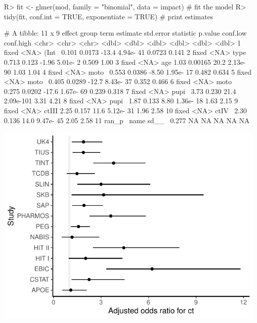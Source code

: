 \documentclass[
]{jss}
\begin{document}
\begin{CodeChunk}
\begin{CodeInput}
R> fit <- glmer(mod, family = "binomial", data = impact) # fit the model
R> tidy(fit, conf.int = TRUE, exponentiate = TRUE)       # print estimates
\end{CodeInput}
\begin{CodeOutput}
# A tibble: 11 x 9
   effect group term  estimate std.error statistic    p.value conf.low conf.high
   <chr>  <chr> <chr>    <dbl>     <dbl>     <dbl>      <dbl>    <dbl>     <dbl>
 1 fixed  <NA>  (Int~    0.101   0.0173     -13.4   4.94e- 41   0.0723     0.141
 2 fixed  <NA>  type~    0.713   0.123       -1.96  5.01e-  2   0.509      1.00 
 3 fixed  <NA>  age      1.03    0.00165     20.2   2.13e- 90   1.03       1.04 
 4 fixed  <NA>  moto~    0.553   0.0386      -8.50  1.95e- 17   0.482      0.634
 5 fixed  <NA>  moto~    0.405   0.0289     -12.7   8.43e- 37   0.352      0.466
 6 fixed  <NA>  moto~    0.275   0.0202     -17.6   1.67e- 69   0.239      0.318
 7 fixed  <NA>  pupi~    3.73    0.230       21.4   2.09e-101   3.31       4.21 
 8 fixed  <NA>  pupi~    1.87    0.133        8.80  1.36e- 18   1.63       2.15 
 9 fixed  <NA>  ctIII    2.25    0.157       11.6   5.12e- 31   1.96       2.58 
10 fixed  <NA>  ctIV~    2.30    0.136       14.0   9.47e- 45   2.05       2.58 
11 ran_p~ name  sd__~    0.277  NA           NA    NA          NA         NA    
\end{CodeOutput}
\end{CodeChunk}

\begin{CodeChunk}


\begin{center}\includegraphics{Imputation_of_Incomplete_Multilevel_Data_files/figure-latex/forest-1} \end{center}

\end{CodeChunk}
\end{document}

